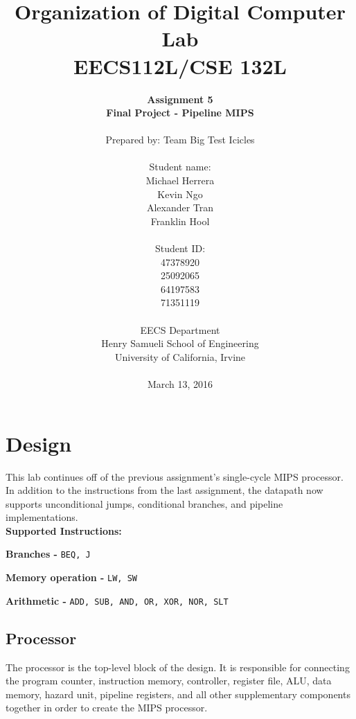 \documentclass{article}
\begin{document}
\title{Organization of Digital Computer Lab \\ EECS112L/CSE 132L}
\author{\textbf{Assignment 5 }\\ \textbf{Final Project - Pipeline MIPS} \\ \\
Prepared by: Team Big Test Icicles \\ \\ Student name: \\ Michael Herrera \\ Kevin Ngo \\ Alexander Tran \\ Franklin Hool \\ \\ Student ID: \\ 47378920 \\ 25092065 \\ 64197583 \\ 71351119 \\ \\ 
EECS Department\\ Henry Samueli School of Engineering \\ University of California, Irvine \\ \\
{March 13, 2016}} 


\date{}
\maketitle


\section{Design}
 This lab continues off of the previous assignment's single-cycle MIPS processor. In addition to the instructions from the last assignment, the datapath now supports unconditional jumps, conditional branches, and pipeline implementations.  
\\

\textbf{Supported Instructions:}

\textbf{Branches - }\texttt{BEQ, J}

\textbf{Memory operation - }\texttt{LW, SW}

\textbf{Arithmetic - }\texttt{ADD, SUB, AND, OR, XOR, NOR, SLT}

	\subsection{Processor}
	The processor is the top-level block of the design. It is responsible for connecting the program counter, instruction memory, controller, register file, ALU, data memory, hazard unit, pipeline registers, and all other supplementary components together in order to create the MIPS processor.  
	
\end{document}
